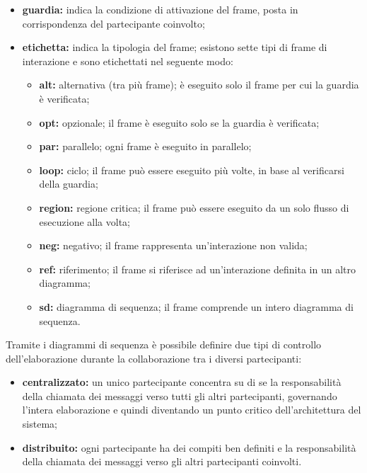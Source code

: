 \begin{itemize}
							\begin{itemize}
								\item \textbf{guardia:} indica la condizione di attivazione del frame, posta in corrispondenza del partecipante coinvolto;
								\item \textbf{etichetta:} indica la tipologia del frame; esistono sette tipi di frame di interazione e sono etichettati nel seguente modo:
								\begin{itemize}
									\item \textbf{alt:} alternativa (tra più frame); è eseguito solo il frame per cui la guardia è verificata;
									\item \textbf{opt:} opzionale; il frame è eseguito solo se la guardia è verificata;
									\item \textbf{par:} parallelo; ogni frame è eseguito in parallelo;
									\item \textbf{loop:} ciclo; il frame può essere eseguito più volte, in base al verificarsi della guardia;
									\item \textbf{region:} regione critica; il frame può essere eseguito da un solo flusso di esecuzione alla volta;
									\item \textbf{neg:} negativo; il frame rappresenta un'interazione non valida;
									\item \textbf{ref:} riferimento; il frame si riferisce ad un'interazione definita in un altro diagramma;
									\item \textbf{sd:} diagramma di sequenza; il frame comprende un intero diagramma di sequenza.
								\end{itemize}
							\end{itemize}
						\end{itemize}
						Tramite i diagrammi di sequenza è possibile definire due tipi di controllo dell'elaborazione durante la collaborazione tra i diversi partecipanti:
						\begin{itemize}
							\item \textbf{centralizzato:} un unico partecipante concentra su di se la responsabilità della chiamata dei messaggi verso tutti gli altri partecipanti, governando l'intera elaborazione e quindi diventando un punto critico dell'architettura del sistema;
							\item \textbf{distribuito:} ogni partecipante ha dei compiti ben definiti e la responsabilità della chiamata dei messaggi verso gli altri partecipanti coinvolti.
						\end{itemize}
						
